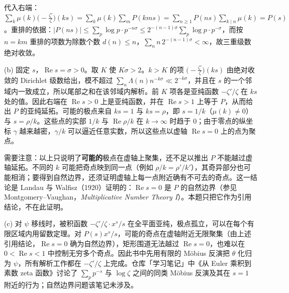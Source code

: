 \documentclass[11pt,a4paper]{article}
\renewcommand{\Re}{\operatorname{Re}}
\begin{document}
代入右端：$\sum_k\mu(k)\bigl(-\frac{\zeta'}{\zeta}\bigr)(ks)=\sum_k\mu(k)\sum_mP(kms)=\sum_{n\ge1}P(ns)\sum_{k\mid n}\mu(k)=P(s)$。重排的依据：$|P(ns)|\le\sum_p\log p\cdot p^{-n\sigma}\le2^{-(n-1)\sigma}\sum_p\log p\cdot p^{-\sigma}$，而按 $n=km$ 重排的项数为除数个数 $d(n)\le n$，$\sum_nn\,2^{-(n-1)\sigma}<\infty$，故三重级数绝对收敛。

(b) 固定 $s$，$\Re s=\sigma>0$。取 $K$ 使 $K\sigma>2$。$k>K$ 的项 $\bigl(-\frac{\zeta'}{\zeta}\bigr)(ks)$ 由绝对收敛的 Dirichlet 级数给出，模不超过 $\sum_n\Lambda(n)n^{-k\sigma}\ll2^{-k\sigma}$，并且在 $s$ 的一个邻域内一致成立，所以尾部之和在该邻域内解析。前 $K$ 项各是亚纯函数 $-\zeta'/\zeta$ 在 $ks$ 处的值。因此右端在 $\Re s>0$ 上是亚纯函数，并在 $\Re s>1$ 上等于 $P$，从而给出 $P$ 的亚纯延拓。可能的极点来自 $ks=1$ 与 $ks=\rho$，即 $s=1/k$（$\mu(k)\ne0$）与 $s=\rho/k$。这些点的实部 $1/k$ 与 $\Re\rho/k$ 在 $k\to\infty$ 时趋于 $0$；由于零点的纵坐标 $\gamma$ 越来越密，$\gamma/k$ 可以逼近任意实数，所以这些点以虚轴 $\Re s=0$ 上的点为聚点。

需要注意：以上只说明了\textbf{可能的}极点在虚轴上聚集，还不足以推出 $P$ 不能越过虚轴延拓。不同的 $k$ 可能把奇点映到同一点（例如 $\rho/k=\rho'/k'$），其奇异部分也可能相消；要得到自然边界，还须证明虚轴上每一点附近确有不可去的奇点。这一结论是 Landau 与 Walfisz（1920）证明的：$\Re s=0$ 是 $P$ 的自然边界（参见 Montgomery--Vaughan，\emph{Multiplicative Number Theory I}）。本题只把它作为引用结论，不在此证明。

(c) 对 $\psi$ 移线时，被积函数 $-\zeta'/\zeta\cdot x^s/s$ 在全平面亚纯，极点孤立，可以在每个有限区域内用留数定理。对 $P(s)x^s/s$，可能的奇点在虚轴附近无限聚集（由上述引用结论，$\Re s=0$ 确为自然边界），矩形围道无法越过 $\Re s=0$，也难以在 $0<\Re s<1$ 中控制无穷多个奇点。因此书中先用有限的 Möbius 反演把 $\theta$ 化归为 $\psi$，所有解析工作都在 $-\zeta'/\zeta$ 上完成。仓库「学习笔记」中《从 Euler 乘积到素数 zeta 函数》讨论了 $\sum_p p^{-s}$ 与 $\log\zeta$ 之间的同类 Möbius 反演及其在 $s=1$ 附近的行为；自然边界问题该笔记未涉及。
\end{document}
